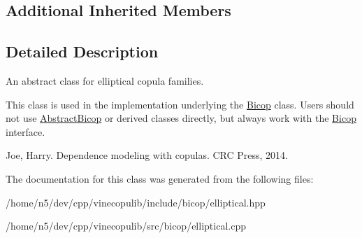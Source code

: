 \subsection*{Additional Inherited Members}


\subsection{Detailed Description}
An abstract class for elliptical copula families. 

This class is used in the implementation underlying the \hyperlink{classvinecopulib_1_1_bicop}{Bicop} class. Users should not use \hyperlink{classvinecopulib_1_1_abstract_bicop}{Abstract\+Bicop} or derived classes directly, but always work with the \hyperlink{classvinecopulib_1_1_bicop}{Bicop} interface.

Joe, Harry. Dependence modeling with copulas. C\+RC Press, 2014. 

The documentation for this class was generated from the following files\+:\begin{DoxyCompactItemize}
\item 
/home/n5/dev/cpp/vinecopulib/include/bicop/elliptical.\+hpp\item 
/home/n5/dev/cpp/vinecopulib/src/bicop/elliptical.\+cpp\end{DoxyCompactItemize}
